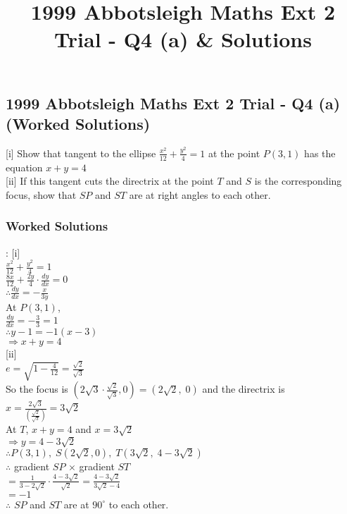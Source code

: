 \documentclass[10pt,a4paper]{report}
\title{1999 Abbotsleigh Maths Ext 2 Trial - Q4 (a) & Solutions}
\theoremstyle{thm}
\begin{document}
\subsection*{1999 Abbotsleigh Maths Ext 2 Trial - Q4 (a) (Worked Solutions)}
[i] Show that tangent to the ellipse $\displaystyle\frac{{{x^2}}}{{12}} + 
\frac{{{y^2}}}{4} = 1$ at the point $P\left( {3,1} \right)$ has the equation $x 
+ y = 4$\\[1em]
[ii] If this tangent cuts the directrix at the point $T$ and $S$ is the 
corresponding focus, show that $SP$ and $ST$ are at right angles to each 
other.\\
\subsubsection{Worked Solutions}:
[i]\\
$\frac{x^2}{12} + \frac{y^2}{4} = 1$\\
$\frac{8x}{12} + \frac{2y}{4} \cdot \frac{dy}{dx} = 0$\\
$\therefore \frac{dy}{dx} =  - \frac{x}{3y}$\\[1em]
At $P\left(3,1\right)$, \\
$\frac{dy}{dx} =  - \frac{3}{3} = 1$\\
$\therefore y - 1 =  - 1\left(x - 3\right)$\\
$ \Rightarrow x + y = 4$\\[1em]
[ii]\\
$e = \sqrt {1 - \frac{4}{12}}  = \frac{\sqrt 2 }{\sqrt 3 }$\\
So the focus is $\left(2\sqrt 3  \cdot \frac{\sqrt 2 }{\sqrt 3 },0 \right) = \left(2\sqrt 2 ,\;0 \right)$ and the directrix is $x = \frac{2\sqrt 3 }{\left( \frac{\sqrt 2 }{\sqrt 3 } \right)} = 3\sqrt 2 $\\[1em]
At $T$, $x + y = 4$ and $x = 3\sqrt 2 $\\
$ \Rightarrow y = 4 - 3\sqrt 2 $\\
$\therefore P\left( {3,1} \right),\;S\left(2\sqrt 2 ,0 \right),\;T\left(3\sqrt 2 ,\;4 - 3\sqrt 2 \right)$\\[1em]
$\therefore $ gradient $SP$ $ \times $ gradient $ST$\\
$ = \frac{1}{3 - 2\sqrt 2 } \cdot \frac{4 - 3\sqrt 2 }{\sqrt 2 } = \frac{4 - 3\sqrt 2 }{3\sqrt 2  - 4}$\\
$ =  - 1$\\[1em]
$\therefore $ $SP$ and $ST$ are at $90^\circ $ to each other.\\
\end{document}
